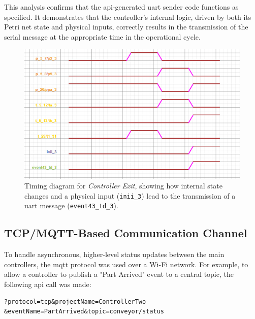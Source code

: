 This analysis confirms that the \gls{api}-generated \gls{uart} sender code functions as specified. It demonstrates that the controller's internal logic, driven by both its Petri net state and physical inputs, correctly results in the transmission of the serial message at the appropriate time in the operational cycle.

\begin{figure}[htb!]
    \centering
    \includegraphics[width=\columnwidth]{Chapters/Figures/timing_diagram_controller_three.png}
    \caption{Timing diagram for \textit{Controller Exit}, showing how internal state changes and a physical input (\texttt{inii\_3}) lead to the transmission of a \gls{uart} message (\texttt{event43\_td\_3}).}
    \label{fig:timing_diagram_controller_three}
\end{figure}

\subsection{TCP/MQTT-Based Communication Channel}
\label{subsec:tcp_implementation}

To handle asynchronous, higher-level status updates between the main controllers, the \gls{mqtt} protocol was used over a Wi-Fi network. For example, to allow a controller to publish a "Part Arrived" event to a central topic, the following \gls{api} call was made:

\begin{verbatim}
?protocol=tcp&projectName=ControllerTwo
&eventName=PartArrived&topic=conveyor/status
\end{verbatim}

